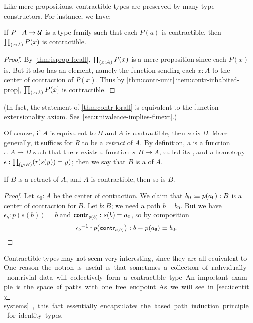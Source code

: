 Like mere propositions, contractible types are preserved by many type constructors.
For instance, we have:

\begin{lem}\label{thm:contr-forall}
  If $P:A\to\mathcal{U}$ is a type family such that each $P(a)$ is contractible, then $\prd{x:A} P(x)$ is contractible.
\end{lem}
\begin{proof}
  By \autoref{thm:isprop-forall}, $\prd{x:A} P(x)$ is a mere proposition since each $P(x)$ is.
  But it also has an element, namely the function sending each $x:A$ to the center of contraction of $P(x)$.
  Thus by \autoref{thm:contr-unit}\ref{item:contr-inhabited-prop}, $\prd{x:A} P(x)$ is contractible.
\end{proof}

%
(In fact, the statement of \autoref{thm:contr-forall} is equivalent to the function extensionality axiom.
See~\autoref{sec:univalence-implies-funext}.)

Of course, if $A$ is equivalent to $B$ and $A$ is contractible, then so is $B$.
More generally, it suffices for $B$ to be a \emph{retract} of $A$.
By definition, a 
%
%
is a function $r : A \to B$ such that there exists a function $s : B \to A$, called its ,
%
%
and a homotopy $\epsilon:\prd{y:B} (r(s(y))=y)$; then we say that $B$ is a %
of $A$.

\begin{lem}\label{thm:retract-contr}
  If $B$ is a retract of $A$, and $A$ is contractible, then so is $B$.
\end{lem}
\begin{proof}
  Let $a_0 : A$ be the center of contraction.
  We claim that $b_0 \vcentcolon\equiv p(a_0) : B$ is a center of contraction for $B$.
  Let $b : B$; we need a path $b = b_0$.
  But we have $\epsilon_b : p(s(b)) = b$ and $\mathsf{contr}_{s(b)} : s(b) = a_0$, so by composition
  \[ \opp{\epsilon_b} \ct \ap{p}{\contr_{s(b)}} : b = p(a_0) \jdeq b_0 . \qedhere\]
\end{proof}

Contractible types may not seem very interesting, since they are all equivalent to \unit.
One reason the notion is useful is that sometimes a collection of individually nontrivial data will collectively form a contractible type.
An important example is the space of paths with one free endpoint.
As we will see in \autoref{sec:identity-systems}, this fact essentially
encapsulates the based path induction principle for identity types.

